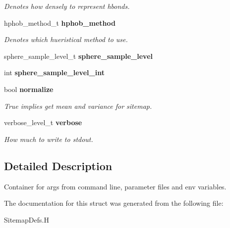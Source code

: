 \begin{CompactItemize}
\begin{CompactList}\small\item\em Denotes how densely to represent hbonds. \item\end{CompactList}\item 
hphob\_\-method\_\-t \bf{hphob\_\-method}\label{structASCbase_1_1sitemap__variables__t_2a80a7d61e4e7b4062d4f7add6a5fb06}

\begin{CompactList}\small\item\em Denotes which hueristical method to use. \item\end{CompactList}\item 
sphere\_\-sample\_\-level\_\-t \textbf{sphere\_\-sample\_\-level}\label{structASCbase_1_1sitemap__variables__t_a45236ac5b594ec4cefad791b4f152b1}

\item 
int \textbf{sphere\_\-sample\_\-level\_\-int}\label{structASCbase_1_1sitemap__variables__t_d2fb2b8ce3b46216370b6006d8e757aa}

\item 
bool \bf{normalize}\label{structASCbase_1_1sitemap__variables__t_74cbcaa59bfae447d25c367ca3eab643}

\begin{CompactList}\small\item\em True implies get mean and variance for sitemap. \item\end{CompactList}\item 
verbose\_\-level\_\-t \bf{verbose}\label{structASCbase_1_1sitemap__variables__t_f9d61423254f0b0be183097564d60d2f}

\begin{CompactList}\small\item\em How much to write to stdout. \item\end{CompactList}\end{CompactItemize}


\subsection{Detailed Description}
Container for args from command line, parameter files and env variables. 



The documentation for this struct was generated from the following file:\begin{CompactItemize}
\item 
Sitemap\-Defs.H\end{CompactItemize}
